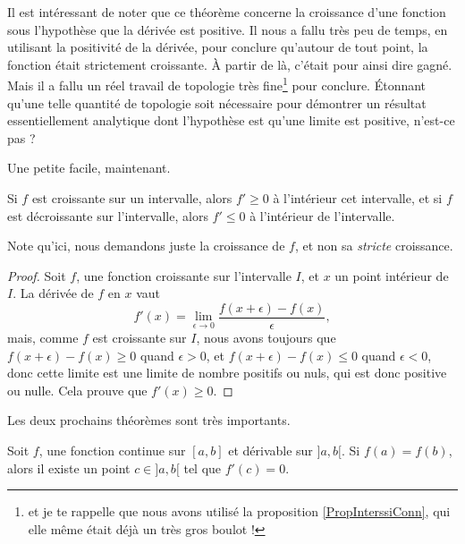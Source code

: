 Il est intéressant de noter que ce théorème concerne la croissance d'une fonction sous l'hypothèse que la dérivée est positive. Il nous a fallu très peu de temps, en utilisant la positivité de la dérivée, pour conclure qu'autour de tout point, la fonction était strictement croissante. À partir de là, c'était pour ainsi dire gagné. Mais il a fallu un réel travail de topologie très fine\footnote{et je te rappelle que nous avons utilisé la proposition \ref{PropInterssiConn}, qui elle même était déjà un très gros boulot !} pour conclure. Étonnant qu'une telle quantité de topologie soit nécessaire pour démontrer un résultat essentiellement analytique dont l'hypothèse est qu'une limite est positive, n'est-ce pas ? 

Une petite facile, maintenant.
\begin{proposition}
    Si $f$ est croissante sur un intervalle, alors $f'\geq 0$ à l'intérieur cet intervalle, et si $f$ est décroissante sur l'intervalle, alors $f'\leq 0$ à l'intérieur de l'intervalle.
\end{proposition}

Note qu'ici, nous demandons juste la croissance de $f$, et non sa \emph{stricte} croissance.

\begin{proof}
    Soit $f$, une fonction croissante sur l'intervalle $I$, et $x$ un point intérieur de $I$. La dérivée de $f$ en $x$ vaut
    \begin{equation}
        f'(x)=\lim_{\epsilon\to 0}\frac{ f(x+\epsilon)-f(x) }{\epsilon},
    \end{equation}
    mais, comme $f$ est croissante sur $I$, nous avons toujours que $f(x+\epsilon)-f(x)\geq0$ quand $\epsilon>0$, et $f(x+\epsilon)-f(x)\leq0$ quand $\epsilon<0$, donc cette limite est une limite de nombre positifs ou nuls, qui est donc positive ou nulle. Cela prouve que $f'(x)\geq 0$.
\end{proof}

Les deux prochains théorèmes sont très importants.
\begin{theorem}       \label{ThoRolle}
    Soit $f$, une fonction continue sur $[a,b]$ et dérivable sur $]a,b[$. Si $f(a)=f(b)$, alors il existe un point $c\in]a,b[$ tel que $f'(c)=0$.
\end{theorem}

